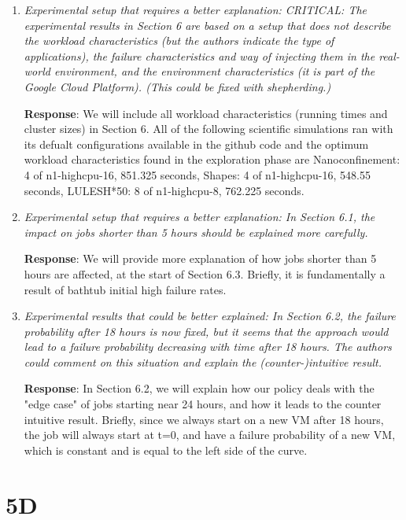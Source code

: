 \documentclass{article}
\newcommand{\resp}[1]{\textbf{Response}: #1}
\newcommand{\revmade}[1]{\textbf{Revision Made}: #1}
\begin{document}
\begin{enumerate}
\item \emph{Experimental setup that requires a better explanation: CRITICAL: The experimental results in Section 6 are based on a setup that does not describe the workload characteristics (but the authors indicate the type of applications), the failure characteristics and way of injecting them in the real-world environment, and the environment characteristics (it is part of the Google Cloud Platform). (This could be fixed with shepherding.)}

\resp{We will include all workload characteristics (running times and cluster sizes) in Section 6.
All of the following scientific simulations ran with its defualt configurations available in the github code and the optimum workload characteristics found in the exploration phase are Nanoconfinement: 4 of n1-highcpu-16, 851.325 seconds,
Shapes: 4 of n1-highcpu-16, 548.55 seconds,
LULESH*50: 8 of n1-highcpu-8, 762.225 seconds.
}

\item \emph{Experimental setup that requires a better explanation: In Section 6.1, the impact on jobs shorter than 5 hours should be explained more carefully. }

\resp{We will provide more explanation of how jobs shorter than 5 hours are affected, at the start of Section 6.3. Briefly, it is fundamentally a result of bathtub initial high failure rates.} 

\item \emph{Experimental results that could be better explained:  In Section 6.2, the failure probability after 18 hours is now fixed, but it seems that the approach would lead to a failure probability decreasing with time after 18 hours. The authors could comment on this situation and explain the (counter-)intuitive result.}

\resp{In Section 6.2, we will explain how our policy deals with the "edge case" of jobs starting near 24 hours, and how it leads to the counter intuitive result. Briefly, since we always start on a new VM after 18 hours, the job will always start at t=0, and have a failure probability of a new VM, which is constant and is equal to the left side of the curve.}


\end{enumerate}

\section{5D}
\end{document}
